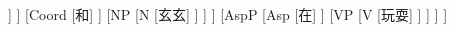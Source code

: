 \documentclass{article}
\begin{document}
	\begin{CJK}{UTF8}{gbsn}
		\begin{forest}
		[S
			[NP
				[NP
					[N
						[包包]
					]
				]
				[Coord
					[和]
				]
				[NP
					[N
						[玄玄]
					]
				]
			]
			[AspP
				[Asp
					[在]
				]
				[VP
					[V
						[玩耍]
					]
				]
			]
		]
		\end{forest}
	\end{CJK}
\end{document}
